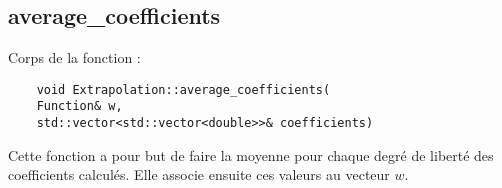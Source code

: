\subsection{average\_coefficients}
\label{average_coefficients}

Corps de la fonction :

\begin{lstlisting}
	void Extrapolation::average_coefficients(
	Function& w,
	std::vector<std::vector<double>>& coefficients)	
\end{lstlisting}

Cette fonction a pour but de faire la moyenne pour chaque degré de liberté des coefficients calculés. Elle associe ensuite ces valeurs au vecteur $w$.

